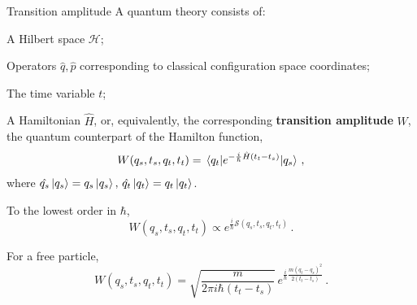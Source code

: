 \documentclass[12pt,titlepage]{article}
\begin{document}
\begin{frame}{Transition amplitude}
    A quantum theory consists of:
    \begin{list}{\,}{\leftmargin=1em \itemindent=0em}
        \item<1-> A Hilbert space $\mathcal{H}$;
        \item<2-> Operators $\hat{q},\hat{p}$ corresponding to classical configuration space coordinates;
        \item<3-> The time variable $t$;
        \item<4-> A Hamiltonian $\hat{H}$, or, equivalently, the corresponding \textbf{transition amplitude} $W$, the quantum counterpart of the Hamilton function,
        \begin{align}
            W(q_s,t_s,q_t,t_t)=\mel{q_t}{e^{-\frac{i}{\hbar}\hat{H}(t_t-t_s)}}{q_s} \,,
        \end{align}
        where $\hat{q_s}\ket{q_s}=q_s\ket{q_s},\,\hat{q_t}\ket{q_t}=q_t\ket{q_t}$.
        \item<5->[] To the lowest order in $\hbar$,
        \begin{equation}
            W(q_s,t_s,q_t,t_t)\propto e^{\frac{i}{\hbar}\mathcal{S}(q_s,t_s,q_t,t_t)}\,.
        \end{equation}
        \item<6->[] For a free particle,
        \begin{equation}
            W(q_s,t_s,q_t,t_t)=\sqrt{\frac{m}{2\pi i\hbar(t_t-t_s)}}\, e^{\frac{i}{\hbar}\frac{m(q_t-q_s)^2}{2(t_t-t_s)}}\,.
        \end{equation}
    \end{list}
\end{frame}
\end{document}
